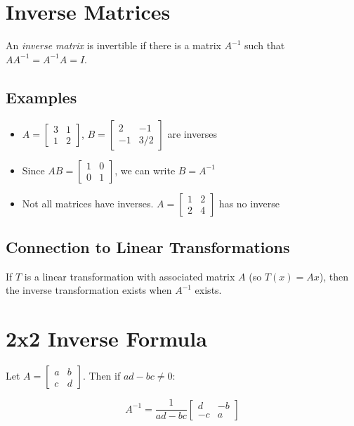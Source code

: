 \documentclass[12pt,a4paper]{article}
\begin{document}
\section{Inverse Matrices}

An \textit{inverse matrix} is invertible if there is a matrix $A^{-1}$ such that $AA^{-1} = A^{-1}A = I$.

\subsection{Examples}

\begin{itemize}
    \item $A = \begin{bmatrix} 3 & 1 \\ 1 & 2 \end{bmatrix}$, $B = \begin{bmatrix} 2 & -1 \\ -1 & 3/2 \end{bmatrix}$ are inverses
    \item Since $AB = \begin{bmatrix} 1 & 0 \\ 0 & 1 \end{bmatrix}$, we can write $B = A^{-1}$
    \item Not all matrices have inverses. $A = \begin{bmatrix} 1 & 2 \\ 2 & 4 \end{bmatrix}$ has no inverse
\end{itemize}

\subsection{Connection to Linear Transformations}

If $T$ is a linear transformation with associated matrix $A$ (so $T(x) = Ax$), then the inverse transformation exists when $A^{-1}$ exists.

\section{2x2 Inverse Formula}

Let $A = \begin{bmatrix} a & b \\ c & d \end{bmatrix}$. Then if $ad-bc \neq 0$:

\[A^{-1} = \frac{1}{ad-bc} \begin{bmatrix} d & -b \\ -c & a \end{bmatrix}\]
\end{document}
